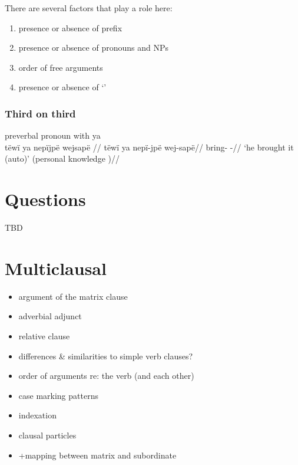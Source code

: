 \documentclass{memoir}
\begin{document}
There are several factors that play a role here:

\begin{enumerate}
\def\labelenumi{\arabic{enumi}.}
\tightlist
\item
  presence or absence of prefix
\item
  presence or absence of pronouns and NPs
\item
  order of free arguments
\item
  presence or absence of  `'
\end{enumerate}

\subsection{Third on third}

\ex  preverbal pronoun with ya  \\\label{convcosnoind-132}
\begingl \glpreamble tëwï ya nepïjpë wejsapë //
\gla tëwï ya nepï-jpë wej-sapë//
\glb {}  bring- -//
\glft ‘he brought it (auto)’ (personal knowledge
)//
\endgl
\xe

\chapter{\texorpdfstring{Questions \label{questions}}{Questions }}

TBD

\chapter{\texorpdfstring{Multiclausal
\label{multiclausal}}{Multiclausal }}

\begin{itemize}
\item
  argument of the matrix clause
\item
  adverbial adjunct
\item
  relative clause
\item
  differences \& similarities to simple verb clauses?
\item
  order of arguments re: the verb (and each other)
\item
  case marking patterns
\item
  indexation
\item
  clausal particles
\item
  +mapping between matrix and subordinate
\end{itemize}
\end{document}
